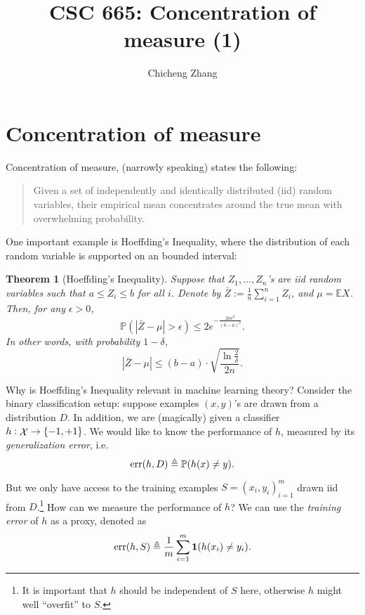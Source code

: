 \documentclass{article}
\title{CSC 665: Concentration of measure (1)}
\author{Chicheng Zhang}
\newtheorem{theorem}{Theorem}
\DeclareMathOperator*{\err}{{\rm err}}
\DeclareMathOperator*{\Xcal}{{\cal X}}
\newcommand{\EE}{\mathbb{E}} %
\newcommand{\PP}{\mathbb{P}} %
\newcommand{\defeq}{\triangleq}
\newcommand*{\one}{{\bf 1}}
\begin{document}
\maketitle

\section{Concentration of measure}

Concentration of measure, (narrowly speaking) states the following:
\begin{quote}
Given a set of independently and identically distributed (iid) random variables,
their empirical mean concentrates around the true mean with overwhelming probability.
\end{quote}

One important example is Hoeffding's Inequality, where the distribution of each random variable is supported on an bounded interval:
\begin{theorem}[Hoeffding's Inequality]
Suppose that $Z_1, \ldots, Z_n$'s are iid random variables such that $a \leq Z_i \leq b$ for all $i$. Denote by $\bar{Z} := \frac 1 n \sum_{i=1}^n Z_i$, and $\mu = \EE X$. Then, for any $\epsilon > 0$,
\begin{equation}
 \PP( |\bar{Z} - \mu| > \epsilon ) \leq 2 e^{-\frac{2n\epsilon^2}{(b-a)^2}}.
\label{eqn:hoef}
\end{equation}
In other words, with probability $1-\delta$,
\begin{equation}
 |\bar{Z} - \mu| \leq (b-a) \cdot \sqrt{\frac{\ln\frac{2}{\delta}}{2n}}.
\label{eqn:hoef-conc}
\end{equation}
\label{thm:hoef}
\end{theorem}

Why is Hoeffding's Inequality relevant in machine learning theory? Consider the binary classification setup: suppose examples $(x,y)$'s are drawn from a distribution $D$. In addition, we are (magically) given a classifier
$h: \Xcal \to \cbr{-1,+1}$. We would like to know the performance of $h$, measured by
its {\em generalization error}, i.e.
\[ \err(h, D) \defeq \PP(h(x) \neq y). \]

But we only have access to the training examples $S = {(x_i, y_i)}_{i=1}^m$ drawn iid from $D$.\footnote{It is important that $h$ should be independent of $S$ here, otherwise $h$ might well ``overfit'' to $S$.} How can we measure the performance of $h$? We can use the {\em training error} of $h$ as a proxy, denoted as
\[ \err(h, S) \defeq \frac{1}{m} \sum_{i=1}^m \one(h(x_i) \neq y_i). \]
\end{document}
